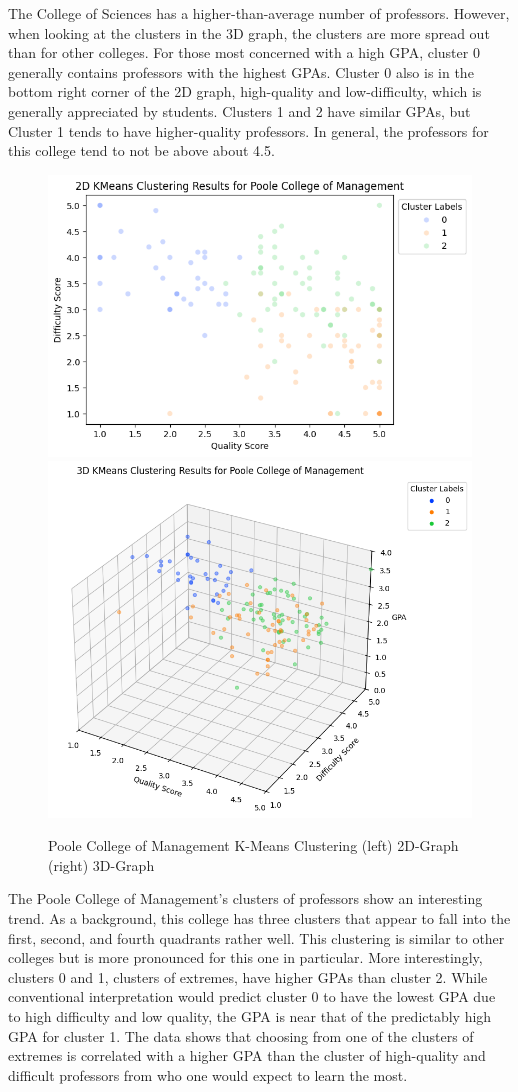 \documentclass[sigconf,nonacm]{acmart}
\begin{document}
The College of Sciences has a higher-than-average number of professors. However, when looking at the clusters in the 3D graph, the clusters are more spread out than for other colleges. For those most concerned with a high GPA, cluster 0 generally contains professors with the highest GPAs. Cluster 0 also is in the bottom right corner of the 2D graph, high-quality and low-difficulty, which is generally appreciated by students. Clusters 1 and 2 have similar GPAs, but Cluster 1 tends to have higher-quality professors. In general, the professors for this college tend to not be above about 4.5.

\begin{figure}[H]
    \centering
    \includegraphics[width=0.45\linewidth]{images/poole-2d.png}
    \includegraphics[width=0.45\linewidth]{images/poole-3d.png}
    \caption{Poole College of Management K-Means Clustering (left) 2D-Graph (right) 3D-Graph}
    \label{fig:enter-label}
\end{figure}

The Poole College of Management’s clusters of professors show an interesting trend. As a background, this college has three clusters that appear to fall into the first, second, and fourth quadrants rather well. This clustering is similar to other colleges but is more pronounced for this one in particular. More interestingly, clusters 0 and 1, clusters of extremes, have higher GPAs than cluster 2. While conventional interpretation would predict cluster 0 to have the lowest GPA due to high difficulty and low quality, the GPA is near that of the predictably high GPA for cluster 1. The data shows that choosing from one of the clusters of extremes is correlated with a higher GPA than the cluster of high-quality and difficult professors from who one would expect to learn the most.
\end{document}
